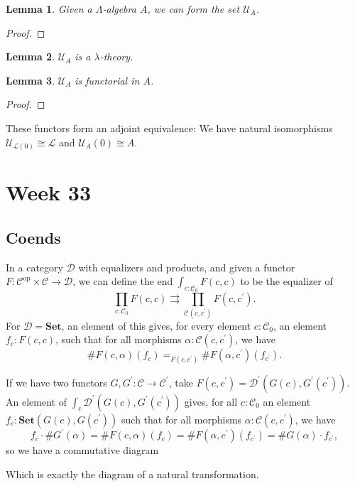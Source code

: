 \documentclass{amsbook}
\newcommand{\Catc}[1]{\mathcal{#1}}
\newcommand{\CC}{\Catc{C}}
\newcommand{\DD}{\Catc{D}}
\newcommand{\Catb}[1]{\mathbf{#1}}
\newcommand{\SET}{\Catb{Set}}
\newcommand{\Ob}[1]{{#1}_0}
\newcommand{\Hom}[3]{{#1}\left(#2,#3\right)}
\newcommand{\op}[1]{\ensuremath{{#1}^\text{op}}}
\newtheorem{lemma}{Lemma}
\theoremstyle{definition}
\begin{document}
  \begin{lemma}
    Given a $ \Lambda $-algebra $ A $, we can form the set $ \mathcal U_A $.
  \end{lemma}
  \begin{proof}

  \end{proof}
  \begin{lemma}
    $ \mathcal U_A $ is a $ \lambda $-theory.
  \end{lemma}

  \begin{lemma}
    $ \mathcal U_A $ is functorial in $ A $.
  \end{lemma}
  \begin{proof}

  \end{proof}

  These functors form an adjoint equivalence: We have natural isomorphisms $ \mathcal U_{\mathcal L(0)} \cong \mathcal L $ and $ \mathcal U_A(0) \cong A $.

  \chapter*{Week 33}
  \section{Coends}
  In a category $ \DD $ with equalizers and products, and given a functor $ F : \op \CC \times \CC \to \DD $, we can define the end $ \int_{c: \Ob \CC} F(c, c) $ to be the equalizer of
  \[ \prod_{c : \Ob \CC} F(c, c) \rightrightarrows \prod_{\Hom{\CC} c {c^\prime}} F(c, c^\prime). \]
  For $ \DD = \SET $, an element of this gives, for every element $ c : \Ob \CC $, an element $ f_c : F(c, c) $, such that for all morphisms $ \alpha : \Hom{\CC}{c}{c^\prime} $, we have
  \[ \#F(c, \alpha)(f_c) =_{F(c, c^\prime)} \#F(\alpha, c^\prime)(f_{c^\prime}). \]

  If we have two functors $ G, G^\prime: \CC \to \CC^\prime $, take $ F(c, c^\prime) = \Hom{\DD^\prime}{G(c)}{G^\prime(c^\prime)} $. An element of $ \int_c \Hom{\DD^\prime}{G(c)}{G^\prime(c^\prime)} $ gives, for all $ c: \Ob \CC $ an element $ f_c : \Hom{\SET}{G(c)}{G(c^\prime)} $ such that for all morphisms $ \alpha : \Hom{\CC}{c}{c^\prime} $, we have
  \[ f_c \cdotp \# G^\prime(\alpha) = \#F(c, \alpha)(f_c) = \#F(\alpha, c^\prime)(f_{c^\prime}) = \#G(\alpha) \cdotp f_{c^\prime}, \]
  so we have a commutative diagram
  \begin{center}
  \end{center}
  Which is exactly the diagram of a natural transformation.
\end{document}
